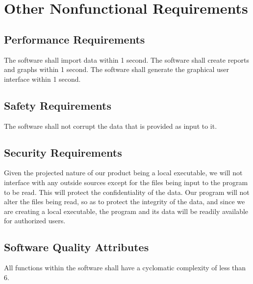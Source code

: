 \section{Other Nonfunctional Requirements}
%

\subsection{Performance Requirements}

The software shall import data within 1 second.
The software shall create reports and graphs within 1 second.
The software shall generate the graphical user interface within 1 second.

\subsection{Safety Requirements}

The software shall not corrupt the data that is provided as input to it.

\subsection{Security Requirements}
Given the projected nature of our product being a local executable, we will not interface with any outside sources except for the files being input to the program to be read. This will protect the confidentiality of the data. Our program will not alter the files being read, so as to protect the integrity of the data, and since we are creating a local executable, the program and its data will be readily available for authorized users.

\subsection{Software Quality Attributes}

All functions within the software shall have a cyclomatic complexity of less than 6.
